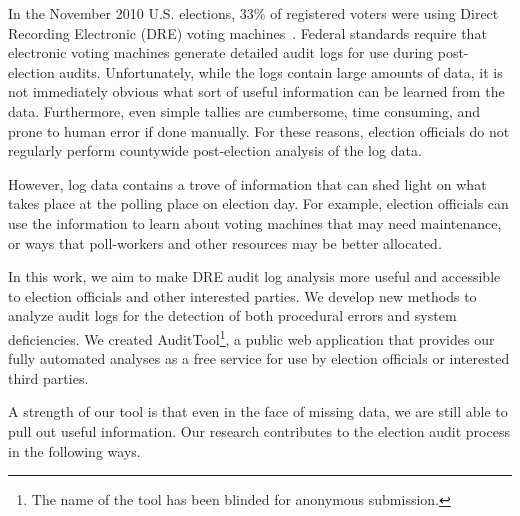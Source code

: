 \documentclass[letterpaper,twocolumn,10pt]{article}
\begin{document}

In the November 2010 U.S. elections, 33\% of registered voters were using Direct
Recording Electronic (DRE) voting machines~\cite{verifiedvoting-votingsystems}.
Federal standards require that electronic voting machines generate detailed
audit logs for use during post-election audits. Unfortunately, while the logs
contain large amounts of data, it is not immediately obvious what sort of useful
information can be learned from the data. Furthermore, even simple
tallies are cumbersome, time consuming, and prone to human error if done
manually. For these reasons, election officials do not regularly perform
countywide post-election analysis of the log data.

However, log data contains a trove of information that can shed light
on what takes place at the polling place on election day. For example,
election officials can use the information to learn about voting machines that
may need maintenance, or ways that poll-workers and other resources may be
better allocated.

In this work, we aim to make DRE audit log analysis more useful and accessible
to election officials and other interested parties. We develop new methods to
analyze audit logs for the detection of both procedural errors and system
deficiencies. We created AuditTool\footnote{The name of the tool has been
  blinded for anonymous submission.}, a public web application that provides our 
fully automated analyses as a free service for use by election officials or
interested third parties.  

A strength of our tool is that even in the face of missing data, we are still 
able to pull out useful information. Our research contributes to the election 
audit process in the following ways.
\end{document}
